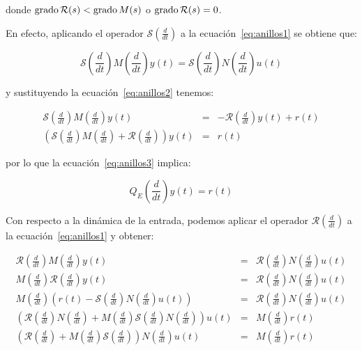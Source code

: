             donde $\operatorname{grado}{\mathcal{R}(s)} < \operatorname{grado}{M(s)}$ o $\operatorname{grado}{\mathcal{R}(s)} = 0$.

            En efecto, aplicando el operador $\mathcal{S} \left( \frac{d}{dt} \right)$ a la ecuación~\ref{eq:anillos1} se obtiene que:

            \begin{equation*}
                \mathcal{S} \left( \frac{d}{dt} \right) M \left( \frac{d}{dt} \right) y(t) = \mathcal{S} \left( \frac{d}{dt} \right) N \left( \frac{d}{dt} \right) u(t)
            \end{equation*}

            y sustituyendo la ecuación~\ref{eq:anillos2} tenemos:

            \begin{eqnarray*}
                \mathcal{S} \left( \frac{d}{dt} \right) M \left( \frac{d}{dt} \right) y(t) & = & -\mathcal{R} \left( \frac{d}{dt} \right) y(t) + r(t) \\
                \left( \mathcal{S} \left( \frac{d}{dt} \right) M \left( \frac{d}{dt} \right) + \mathcal{R} \left( \frac{d}{dt} \right) \right) y(t) & = & r(t)
            \end{eqnarray*}

            por lo que la ecuación~\ref{eq:anillos3} implica:

            \begin{equation*}
                Q_E \left( \frac{d}{dt} \right) y(t) = r(t)
            \end{equation*}

            Con respecto a la dinámica de la entrada, podemos aplicar el operador $\mathcal{R} \left( \frac{d}{dt} \right)$ a la ecuación~\ref{eq:anillos1} y obtener:

            \begin{eqnarray*}
                \mathcal{R} \left( \frac{d}{dt} \right) M \left( \frac{d}{dt} \right) y(t) & = & \mathcal{R} \left( \frac{d}{dt} \right) N \left( \frac{d}{dt} \right) u(t) \\
                M \left( \frac{d}{dt} \right) \mathcal{R} \left( \frac{d}{dt} \right) y(t) & = & \mathcal{R} \left( \frac{d}{dt} \right) N \left( \frac{d}{dt} \right) u(t) \\
                M \left( \frac{d}{dt} \right) \left( r(t) - \mathcal{S} \left( \frac{d}{dt} \right) N \left( \frac{d}{dt} \right) u(t) \right) & = & \mathcal{R} \left( \frac{d}{dt} \right) N \left( \frac{d}{dt} \right) u(t) \\
                \left( \mathcal{R} \left( \frac{d}{dt} \right) N \left( \frac{d}{dt} \right) + M \left( \frac{d}{dt} \right) \mathcal{S} \left( \frac{d}{dt} \right) N \left( \frac{d}{dt} \right) \right) u(t) & = & M \left( \frac{d}{dt} \right) r(t) \\
                \left( \mathcal{R} \left( \frac{d}{dt} \right) + M \left( \frac{d}{dt} \right) \mathcal{S} \left( \frac{d}{dt} \right) \right) N \left( \frac{d}{dt} \right) u(t) & = & M \left( \frac{d}{dt} \right) r(t) \\
            \end{eqnarray*}

